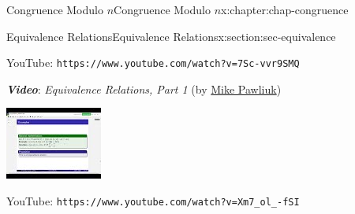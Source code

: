 \documentclass[oneside,10pt,]{book}
\newcommand{\mono}[1]{\texttt{#1}}
\newcommand{\alert}[1]{\textbf{\textit{#1}}}
\numberwithin{equation}{section}
\newlength{\qrsize}
\newlength{\previewwidth}
\begin{document}
\begin{chapterptx}{Congruence Modulo \(n\)}{}{Congruence Modulo \(n\)}{}{}{x:chapter:chap-congruence}
\begin{sectionptx}{Equivalence Relations}{}{Equivalence Relations}{}{}{x:section:sec-equivalence}
\begin{sidebyside}{1}{0}{0}{0}
\begin{sbspanel}{1}
\begin{tcbraster}[raster columns=2, raster column skip=1pt, raster halign=center, raster force size=false, raster left skip=0pt, raster right skip=0pt]
\begin{tcolorbox}[qrstyle]
\end{tcolorbox}%
\begin{tcolorbox}[captionstyle]%
\small YouTube: \mono{https://www.youtube.com/watch?v=7Sc-vvr9SMQ}\end{tcolorbox}%
\end{tcbraster}%
\end{sbspanel}%
\end{sidebyside}%
\par
\alert{Video}: \emph{Equivalence Relations, Part 1} (by \href{https://www.youtube.com/channel/UCnzqLoGhxAA46i9xcPHZavQ}{Mike Pawliuk})%
\begin{sidebyside}{1}{0}{0}{0}%
\begin{sbspanel}{1}%
\setlength{\qrsize}{9em}
\setlength{\previewwidth}{\linewidth}
\addtolength{\previewwidth}{-\qrsize}
\begin{tcbraster}[raster columns=2, raster column skip=1pt, raster halign=center, raster force size=false, raster left skip=0pt, raster right skip=0pt]%
\begin{tcolorbox}[previewstyle, width=\previewwidth]%
\includegraphics[width=0.80\linewidth,height=\qrsize,keepaspectratio]{images/video-equivalence-relation-2.jpg}%
\end{tcolorbox}%
\begin{tcolorbox}[qrstyle]%
{\hypersetup{urlcolor=black}}%
\end{tcolorbox}%
\begin{tcolorbox}[captionstyle]%
\small YouTube: \mono{https://www.youtube.com/watch?v=Xm7\_ol\_-fSI}\end{tcolorbox}%
\end{tcbraster}%
\end{sbspanel}%
\end{sidebyside}%

\end{sectionptx}
\end{chapterptx}
\end{document}
